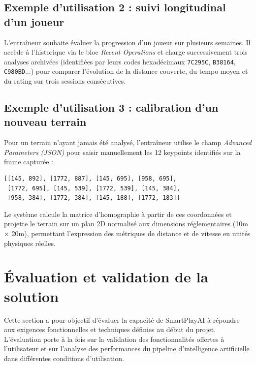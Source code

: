 \subsection*{Exemple d'utilisation 2 : suivi longitudinal d'un joueur}
 
L'entraîneur souhaite évaluer la progression d'un joueur sur plusieurs semaines. Il accède
à l'historique via le bloc \textit{Recent Operations} et charge successivement trois analyses
archivées (identifiées par leurs codes hexadécimaux \texttt{7C295C}, \texttt{B38164},
\texttt{C980BD}...) pour comparer l'évolution de la distance couverte, du tempo moyen et du
rating sur trois sessions consécutives.
 
\subsection*{Exemple d'utilisation 3 : calibration d'un nouveau terrain}
 
Pour un terrain n'ayant jamais été analysé, l'entraîneur utilise le champ
\textit{Advanced Parameters (JSON)} pour saisir manuellement les 12 keypoints identifiés
sur la frame capturée :
 
\begin{center}
\begin{lstlisting}[basicstyle=\small\ttfamily, backgroundcolor=\color{black!5},
                   frame=single]
[[145, 892], [1772, 887], [145, 695], [958, 695],
 [1772, 695], [145, 539], [1772, 539], [145, 384],
 [958, 384], [1772, 384], [145, 188], [1772, 183]]
\end{lstlisting}
\end{center}
 
Le système calcule la matrice d'homographie à partir de ces coordonnées et projette le
terrain sur un plan 2D normalisé aux dimensions réglementaires (10m × 20m), permettant
l'expression des métriques de distance et de vitesse en unités physiques réelles.
 
\section{Évaluation et validation de la solution}

Cette section a pour objectif d'évaluer la capacité de SmartPlayAI à répondre aux
exigences fonctionnelles et techniques définies au début du projet. L'évaluation
porte à la fois sur la validation des fonctionnalités offertes à l'utilisateur et
sur l'analyse des performances du pipeline d'intelligence artificielle dans
différentes conditions d'utilisation.

